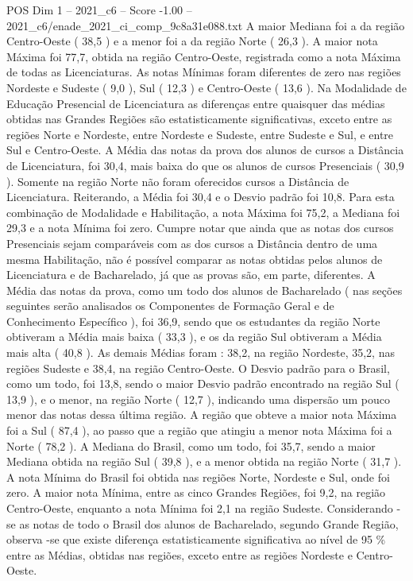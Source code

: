 \begin{textsample}{POS Dim 1 – 2021\_c6 – Score -1.00 – 2021\_c6/enade\_2021\_ci\_comp\_9c8a31e088.txt}
A maior Mediana foi a da região Centro-Oeste ( 38,5 ) e a menor foi a da região Norte ( 26,3 ).
A maior nota Máxima foi 77,7, obtida na região Centro-Oeste, registrada como a nota Máxima de todas as Licenciaturas.
As notas Mínimas foram diferentes de zero nas regiões Nordeste e Sudeste ( 9,0 ), Sul ( 12,3 ) e Centro-Oeste ( 13,6 ).
Na Modalidade de Educação Presencial de Licenciatura as diferenças entre quaisquer das médias obtidas nas Grandes Regiões são estatisticamente significativas, exceto entre as regiões Norte e Nordeste, entre Nordeste e Sudeste, entre Sudeste e Sul, e entre Sul e Centro-Oeste.
A Média das notas da prova dos alunos de cursos a Distância de Licenciatura, foi 30,4, mais baixa do que os alunos de cursos Presenciais ( 30,9 ).
Somente na região Norte não foram oferecidos cursos a Distância de Licenciatura.
Reiterando, a Média foi 30,4 e o Desvio padrão foi 10,8.
Para esta combinação de Modalidade e Habilitação, a nota Máxima foi 75,2, a Mediana foi 29,3 e a nota Mínima foi zero.
Cumpre notar que ainda que as notas dos cursos Presenciais sejam comparáveis com as dos cursos a Distância dentro de uma mesma Habilitação, não é possível comparar as notas obtidas pelos alunos de Licenciatura e de Bacharelado, já que as provas são, em parte, diferentes.
A Média das notas da prova, como um todo dos alunos de Bacharelado ( nas seções seguintes serão analisados os Componentes de Formação Geral e de Conhecimento Específico ), foi 36,9, sendo que os estudantes da região Norte obtiveram a Média mais baixa ( 33,3 ), e os da região Sul obtiveram a Média mais alta ( 40,8 ).
As demais Médias foram : 38,2, na região Nordeste, 35,2, nas regiões Sudeste e 38,4, na região Centro-Oeste.
O Desvio padrão para o Brasil, como um todo, foi 13,8, sendo o maior Desvio padrão encontrado na região Sul ( 13,9 ), e o menor, na região Norte ( 12,7 ), indicando uma dispersão um pouco menor das notas dessa última região.
A região que obteve a maior nota Máxima foi a Sul ( 87,4 ), ao passo que a região que atingiu a menor nota Máxima foi a Norte ( 78,2 ).
A Mediana do Brasil, como um todo, foi 35,7, sendo a maior Mediana obtida na região Sul ( 39,8 ), e a menor obtida na região Norte ( 31,7 ).
A nota Mínima do Brasil foi obtida nas regiões Norte, Nordeste e Sul, onde foi zero.
A maior nota Mínima, entre as cinco Grandes Regiões, foi 9,2, na região Centro-Oeste, enquanto a nota Mínima foi 2,1 na região Sudeste.
Considerando -se as notas de todo o Brasil dos alunos de Bacharelado, segundo Grande Região, observa -se que existe diferença estatisticamente significativa ao nível de 95 \% entre as Médias, obtidas nas regiões, exceto entre as regiões Nordeste e Centro-Oeste.

\end{textsample}
